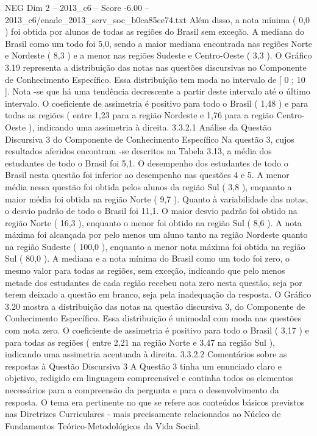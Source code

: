 \begin{textsample}{NEG Dim 2 – 2013\_c6 – Score -6.00 – 2013\_c6/enade\_2013\_serv\_soc\_b0ca85ce74.txt}
Além disso, a nota mínima ( 0,0 ) foi obtida por alunos de todas as regiões do Brasil sem exceção.
A mediana do Brasil como um todo foi 5,0, sendo a maior mediana encontrada nas regiões Norte e Nordeste ( 8,3 ) e a menor nas regiões Sudeste e Centro-Oeste ( 3,3 ).
O Gráfico 3.19 representa a distribuição das notas nas questões discursivas no Componente de Conhecimento Específico.
Essa distribuição tem moda no intervalo de [ 0 ; 10 ].
Nota -se que há uma tendência decrescente a partir deste intervalo até o último intervalo.
O coeficiente de assimetria é positivo para todo o Brasil ( 1,48 ) e para todas as regiões ( entre 1,23 para a região Nordeste e 1,76 para a região Centro-Oeste ), indicando uma assimetria à direita. 3.3.2.1 Análise da Questão Discursiva 3 do Componente de Conhecimento Específico Na questão 3, cujos resultados aferidos encontram -se descritos na Tabela 3.13, a média dos estudantes de todo o Brasil foi 5,1.
O desempenho dos estudantes de todo o Brasil nesta questão foi inferior ao desempenho nas questões 4 e 5.
A menor média nessa questão foi obtida pelos alunos da região Sul ( 3,8 ), enquanto a maior média foi obtida na região Norte ( 9,7 ).
Quanto à variabilidade das notas, o desvio padrão de todo o Brasil foi 11,1.
O maior desvio padrão foi obtido na região Norte ( 16,3 ), enquanto o menor foi obtido na região Sul ( 8,6 ).
A nota máxima foi alcançada por pelo menos um aluno tanto na região Nordeste quanto na região Sudeste ( 100,0 ), enquanto a menor nota máxima foi obtida na região Sul ( 80,0 ).
A mediana e a nota mínima do Brasil como um todo foi zero, o mesmo valor para todas as regiões, sem exceção, indicando que pelo menos metade dos estudantes de cada região recebeu nota zero nesta questão, seja por terem deixado a questão em branco, seja pela inadequação da resposta.
O Gráfico 3.20 mostra a distribuição das notas na questão discursiva 3, do Componente de Conhecimento Específico.
Essa distribuição é unimodal com moda nas questões com nota zero.
O coeficiente de assimetria é positivo para todo o Brasil ( 3,17 ) e para todas as regiões ( entre 2,21 na região Norte e 3,47 na região Sul ), indicando uma assimetria acentuada à direita. 3.3.2.2 Comentários sobre as respostas à Questão Discursiva 3 A Questão 3 tinha um enunciado claro e objetivo, redigido em linguagem compreensível e continha todos os elementos necessários para a compreensão da pergunta e para o desenvolvimento da resposta.
O tema era pertinente no que se refere aos conteúdos básicos previstos nas Diretrizes Curriculares - mais precisamente relacionados ao Núcleo de Fundamentos Teórico-Metodológicos da Vida Social.

\end{textsample}
